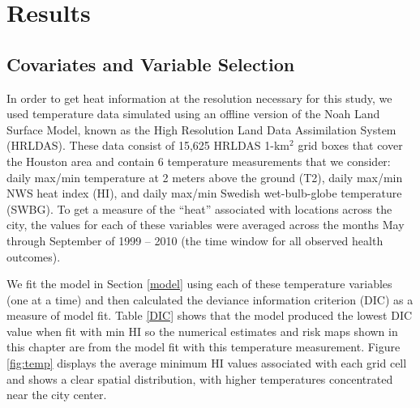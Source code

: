 \documentclass[final]{statsoc}
\begin{document}


\section{Results}\label{results}

\subsection{Covariates and Variable Selection}\label{sec:temp_data}
In order to get heat information at the resolution necessary for this
study, we used temperature data simulated using an offline version of the 
Noah Land Surface Model, known as the High Resolution Land Data Assimilation 
System (HRLDAS).
These data consist of 15,625 HRLDAS 1-km$^2$ grid boxes that cover the Houston
area and contain 6 temperature measurements that we consider: daily max/min 
temperature at 2 meters above the ground (T2), daily max/min NWS heat index (HI), and
daily max/min Swedish wet-bulb-globe temperature (SWBG). To get a measure of the 
``heat'' associated with locations across the city, the values for each of 
these variables were averaged across the months May through September of 
1999 -- 2010 (the time window for all observed health outcomes). 

We fit the model in Section \ref{model} using each of these temperature variables (one at a time) and then calculated the deviance information criterion (DIC) \citep{Spiegelhalter2002} as a measure of model fit. 
Table \ref{DIC} shows that the model produced the lowest DIC value when fit with min HI so the numerical estimates and risk maps shown in this chapter are from the model fit with this temperature measurement. Figure \ref{fig:temp} displays the average minimum HI values associated with each grid cell and shows a clear spatial distribution, with higher temperatures concentrated near the city center. 
\end{document}
